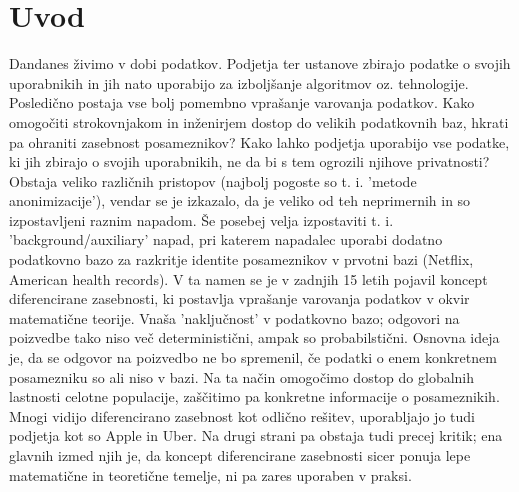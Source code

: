 \documentclass[12pt,a4paper]{amsart}
\theoremstyle{definition} %
\theoremstyle{plain} %
\begin{document}
\section{Uvod}
Dandanes živimo v dobi podatkov. Podjetja ter ustanove zbirajo podatke o svojih uporabnikih in jih nato uporabijo za izboljšanje algoritmov oz. tehnologije. Posledično postaja vse bolj pomembno  vprašanje  varovanja podatkov. Kako omogočiti strokovnjakom in inženirjem dostop do velikih podatkovnih baz, hkrati pa ohraniti zasebnost posameznikov? Kako lahko podjetja uporabijo vse podatke, ki jih zbirajo o svojih uporabnikih, ne da bi s tem ogrozili njihove privatnosti? Obstaja veliko različnih pristopov (najbolj pogoste so t. i. 'metode anonimizacije'), vendar se je izkazalo, da je veliko od teh neprimernih in so izpostavljeni raznim napadom. Še posebej velja izpostaviti t. i. 'background/auxiliary' napad, pri katerem napadalec uporabi dodatno podatkovno bazo za razkritje identite posameznikov v prvotni bazi (Netflix, American health records).  V ta namen se je v zadnjih 15 letih pojavil koncept diferencirane zasebnosti, ki postavlja vprašanje varovanja podatkov v okvir matematične teorije. Vnaša 'naključnost' v podatkovno bazo; odgovori na poizvedbe tako niso več deterministični, ampak so probabilstični. Osnovna ideja je, da se odgovor na poizvedbo ne bo spremenil, če podatki o enem konkretnem posamezniku so ali niso v bazi. Na ta način omogočimo dostop do globalnih lastnosti celotne populacije, zaščitimo pa konkretne informacije o posameznikih. Mnogi vidijo diferencirano zasebnost kot odlično rešitev, uporabljajo jo tudi podjetja kot so Apple in Uber. Na drugi strani pa obstaja tudi precej kritik; ena glavnih izmed njih je, da koncept diferencirane zasebnosti sicer ponuja lepe matematične in teoretične temelje, ni pa zares uporaben v praksi. 
\newline
\newline
\end{document}
